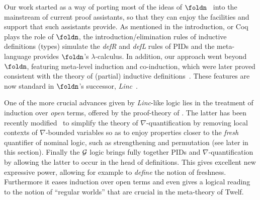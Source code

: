 \documentclass[final]{svjour3}
\begin{document}
Our work started as a way of porting most of the ideas of
$\foldn$~\cite{McDowell01} into the mainstream of current proof
assistants, so that they can enjoy the facilities and support that
such assistants provide.  As mentioned in the introduction, \HOL or Coq plays
the role of $\foldn$, the introduction/elimination rules of inductive
definitions (types) simulate the \emph{defR} and \emph{defL} rules of
PIDs and the \hybrid meta-language provides $\foldn$'s
$\lambda$-calculus. In addition, our approach went beyond 
$\foldn$, featuring  meta-level induction and co-induction, which were later
proved consistent with the theory of (partial)
inductive definitions~\cite{MomiglianoT03}.  These features are now
standard in $\foldn$'s successor, \emph{Linc}~\cite{Tiu04phd}.


One of the more crucial advances given by \emph{Linc}-like logic lies
in the treatment of induction over \emph{open} terms, offered by the
proof-theory of
\cite{Tiu04phd,miller05tocl}. The latter has been recently modified~\cite{Tiu07} to simplify the
theory of $\nabla$-quantification by removing local contexts of
$\nabla$-bounded variables so as to enjoy properties closer to the
\emph{fresh} quantifier of nominal logic, such as strengthening and
permutation (see later in this section).  Finally the $\cal G$ logic
\cite{gacek08lics} brings fully together PIDs and $\nabla$-quantification by
allowing the latter to occur in the head of definitions. This gives
excellent new expressive power, allowing for example to \emph{define}
the notion of freshness. Furthermore it eases induction over open
terms and even gives a logical reading to the notion of ``regular
worlds'' that are crucial in the meta-theory of Twelf.


\smallskip
\end{document}
